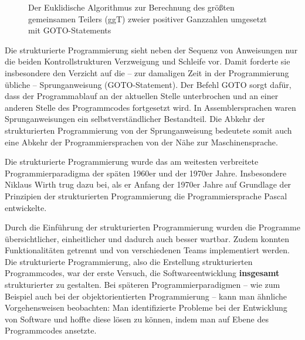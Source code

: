 \begin{figure}[h!]
	
	\centering
	\caption[Der Euklidische Algorithmus zur Berechnung des ggT, umgesetzt mit GOTO-Statements]{Der Euklidische Algorithmus zur Berechnung des größten gemeinsamen Teilers (ggT) zweier positiver Ganzzahlen umgesetzt mit GOTO-Statements}
	\label{fig:goto_programm}
\end{figure}

\pagebreak %

Die strukturierte Programmierung sieht neben der Sequenz von Anweisungen nur die beiden Kontrollstrukturen Verzweigung und Schleife vor. Damit forderte sie insbesondere den Verzicht auf die – zur damaligen Zeit in der Programmierung übliche – Sprunganweisung (GOTO-Statement). Der Befehl GOTO sorgt dafür, dass der Programmablauf an der aktuellen Stelle unterbrochen und an einer anderen Stelle des Programmcodes fortgesetzt wird. In Assemblersprachen waren Sprunganweisungen ein selbstverständlicher Bestandteil. Die Abkehr der strukturierten Programmierung von der Sprunganweisung bedeutete somit auch eine Abkehr der Programmiersprachen von der Nähe zur Maschinensprache.
 
Die strukturierte Programmierung wurde das am weitesten verbreitete Programmierparadigma der späten 1960er und der 1970er Jahre. Insbesondere Niklaus Wirth trug dazu bei, als er Anfang der 1970er Jahre auf Grundlage der Prinzipien der strukturierten Programmierung die Programmiersprache Pascal entwickelte.


Durch die Einführung der strukturierten Programmierung wurden die Programme übersichtlicher, einheitlicher und dadurch auch besser wartbar. Zudem konnten Funktionalitäten getrennt und von verschiedenen Teams implementiert werden. Die strukturierte Programmierung, also die Erstellung strukturierten Programm\-codes, war der erste Versuch, die Softwareentwicklung \textbf{insgesamt} strukturierter zu gestalten. Bei späteren Programmierparadigmen – wie zum Beispiel auch bei der objektorientierten Programmierung – kann man ähnliche Vorgehensweisen beobachten: Man identifizierte Probleme bei der Entwicklung von Software und hoffte diese lösen zu können, indem man auf Ebene des Programmcodes ansetzte.

